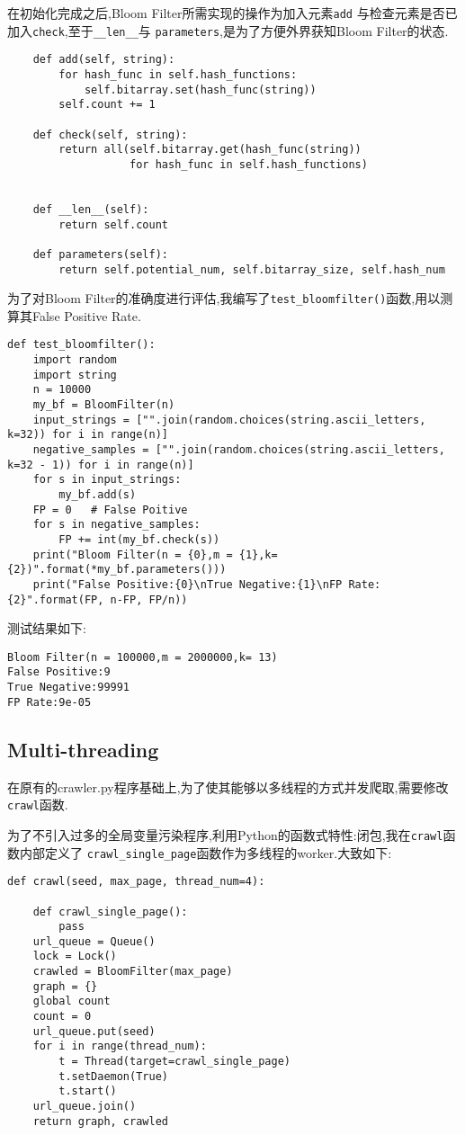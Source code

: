 \documentclass[a4paper]{article}
\begin{document}
在初始化完成之后,Bloom Filter所需实现的操作为加入元素\texttt{add}
与检查元素是否已加入\texttt{check},至于\texttt{__len__}与
\texttt{parameters},是为了方便外界获知Bloom Filter的状态.
\begin{verbatim}
    def add(self, string):
        for hash_func in self.hash_functions:
            self.bitarray.set(hash_func(string))
        self.count += 1

    def check(self, string):
        return all(self.bitarray.get(hash_func(string))
                   for hash_func in self.hash_functions)


    def __len__(self):
        return self.count

    def parameters(self):
        return self.potential_num, self.bitarray_size, self.hash_num
\end{verbatim}

为了对Bloom Filter的准确度进行评估,我编写了\texttt{test_bloomfilter()}函数,用以测算其False Positive Rate.
\begin{verbatim}
def test_bloomfilter():
    import random
    import string
    n = 10000
    my_bf = BloomFilter(n)
    input_strings = ["".join(random.choices(string.ascii_letters, k=32)) for i in range(n)]
    negative_samples = ["".join(random.choices(string.ascii_letters, k=32 - 1)) for i in range(n)]
    for s in input_strings:
        my_bf.add(s)
    FP = 0   # False Poitive
    for s in negative_samples:
        FP += int(my_bf.check(s))
    print("Bloom Filter(n = {0},m = {1},k= {2})".format(*my_bf.parameters()))
    print("False Positive:{0}\nTrue Negative:{1}\nFP Rate:{2}".format(FP, n-FP, FP/n))
\end{verbatim}
测试结果如下:
\begin{verbatim}
Bloom Filter(n = 100000,m = 2000000,k= 13)
False Positive:9
True Negative:99991
FP Rate:9e-05
\end{verbatim}
        \subsection{Multi-threading}
在原有的crawler.py程序基础上,为了使其能够以多线程的方式并发爬取,需要修改\texttt{crawl}函数.

为了不引入过多的全局变量污染程序,利用Python的函数式特性:闭包,我在\texttt{crawl}函数内部定义了
\texttt{crawl_single_page}函数作为多线程的worker.大致如下:
\begin{verbatim}
def crawl(seed, max_page, thread_num=4):

    def crawl_single_page():
        pass
    url_queue = Queue()
    lock = Lock()
    crawled = BloomFilter(max_page)
    graph = {}
    global count
    count = 0
    url_queue.put(seed)
    for i in range(thread_num):
        t = Thread(target=crawl_single_page)
        t.setDaemon(True)
        t.start()
    url_queue.join()
    return graph, crawled
\end{verbatim}
\end{document}
